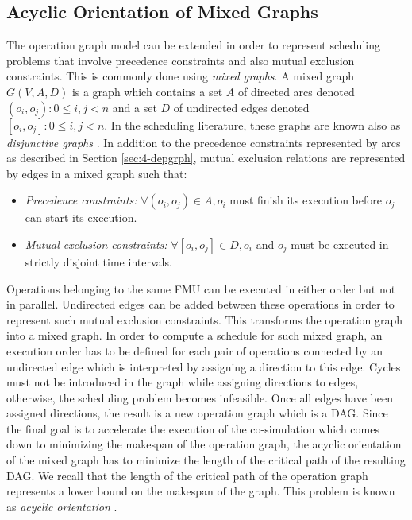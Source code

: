 \subsection{Acyclic Orientation of Mixed Graphs}

The operation graph model can be extended in order to represent scheduling problems that involve precedence constraints and also mutual exclusion constraints. This is commonly done using \textit{mixed graphs}. A mixed graph $G(V,A,D)$ is a graph which contains a set $A$ of directed arcs denoted $(o_i,o_j): 0 \leq i, j < n$ and a set $D$ of undirected edges denoted $[o_i,o_j]: 0 \leq i, j < n$. In the scheduling literature, these graphs are known also as \textit{disjunctive graphs} \cite{balas:1969}. In addition to the precedence constraints represented by arcs as described in Section \ref{sec:4-depgrph}, mutual exclusion relations are represented by edges in a mixed graph such that: 
\begin{itemize}
\item \textit{Precedence constraints:} $\forall (o_i,o_j) \in A, o_i$ must finish its execution before $o_j$ can start its execution.  
\item \textit{Mutual exclusion constraints:} $\forall [o_i,o_j] \in D, o_i$ and $o_j$ must be executed in strictly disjoint time intervals.
\end{itemize}

Operations belonging to the same FMU can be executed in either order but not in parallel. Undirected edges can be added between these operations in order to represent such mutual exclusion constraints. This transforms the operation graph into a mixed graph. In order to compute a schedule for such mixed graph, an execution order has to be defined for each pair of operations connected by an undirected edge which is interpreted by assigning a direction to this edge. Cycles must not be introduced in the graph while assigning directions to edges, otherwise, the scheduling problem becomes infeasible. Once all edges have been assigned directions, the result is a new operation graph which is a DAG.
Since the final goal is to accelerate the execution of the co-simulation which comes down to minimizing the makespan of the operation graph, the acyclic orientation of the mixed graph has to minimize the length of the critical path of the resulting DAG. We recall that the length of the critical path of the operation graph represents a lower bound on the makespan of the graph. This problem is known as \textit{acyclic orientation} \cite{barbosa:1999}.

